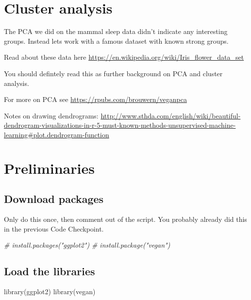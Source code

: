 \documentclass[
]{book}
\newenvironment{Shaded}{\begin{snugshade}}{\end{snugshade}}
\newcommand{\CommentTok}[1]{\textcolor[rgb]{0.56,0.35,0.01}{\textit{#1}}}
\newcommand{\FunctionTok}[1]{\textcolor[rgb]{0.00,0.00,0.00}{#1}}
\newcommand{\NormalTok}[1]{#1}
\begin{document}
\hypertarget{cluster-analysis-1}{%
\section{Cluster analysis}\label{cluster-analysis-1}}

The PCA we did on the mammal sleep data didn't indicate any interesting groups. Instead lets work with a famous dataset with known strong groups.

Read about these data here
\url{https://en.wikipedia.org/wiki/Iris_flower_data_set}

You should defintely read this as further background on PCA and cluster analysis.

For more on PCA see
\url{https://rpubs.com/brouwern/veganpca}

Notes on drawing dendrograms:
\url{http://www.sthda.com/english/wiki/beautiful-dendrogram-visualizations-in-r-5-must-known-methods-unsupervised-machine-learning\#plot.dendrogram-function}

\hypertarget{preliminaries-16}{%
\section{Preliminaries}\label{preliminaries-16}}

\hypertarget{download-packages-2}{%
\subsection{Download packages}\label{download-packages-2}}

Only do this once, then comment out of the script. You probably already did this in the previous Code Checkpoint.

\begin{Shaded}
\begin{Highlighting}[]
\CommentTok{\# install.packages("ggplot2")}
\CommentTok{\# install.package("vegan")}
\end{Highlighting}
\end{Shaded}

\hypertarget{load-the-libraries-4}{%
\subsection{Load the libraries}\label{load-the-libraries-4}}

\begin{Shaded}
\begin{Highlighting}[]
\FunctionTok{library}\NormalTok{(ggplot2)}
\FunctionTok{library}\NormalTok{(vegan)}
\end{Highlighting}
\end{Shaded}
\end{document}
